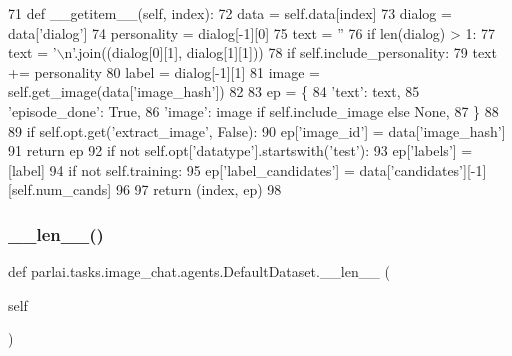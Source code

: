 \begin{DoxyCode}
71     \textcolor{keyword}{def }\_\_getitem\_\_(self, index):
72         data = self.data[index]
73         dialog = data[\textcolor{stringliteral}{'dialog'}]
74         personality = dialog[-1][0]
75         text = \textcolor{stringliteral}{''}
76         \textcolor{keywordflow}{if} len(dialog) > 1:
77             text = \textcolor{stringliteral}{'\(\backslash\)n'}.join((dialog[0][1], dialog[1][1]))
78         \textcolor{keywordflow}{if} self.include\_personality:
79             text += personality
80         label = dialog[-1][1]
81         image = self.get\_image(data[\textcolor{stringliteral}{'image\_hash'}])
82 
83         ep = \{
84             \textcolor{stringliteral}{'text'}: text,
85             \textcolor{stringliteral}{'episode\_done'}: \textcolor{keyword}{True},
86             \textcolor{stringliteral}{'image'}: image \textcolor{keywordflow}{if} self.include\_image \textcolor{keywordflow}{else} \textcolor{keywordtype}{None},
87         \}
88 
89         \textcolor{keywordflow}{if} self.opt.get(\textcolor{stringliteral}{'extract\_image'}, \textcolor{keyword}{False}):
90             ep[\textcolor{stringliteral}{'image\_id'}] = data[\textcolor{stringliteral}{'image\_hash'}]
91             \textcolor{keywordflow}{return} ep
92         \textcolor{keywordflow}{if} \textcolor{keywordflow}{not} self.opt[\textcolor{stringliteral}{'datatype'}].startswith(\textcolor{stringliteral}{'test'}):
93             ep[\textcolor{stringliteral}{'labels'}] = [label]
94         \textcolor{keywordflow}{if} \textcolor{keywordflow}{not} self.training:
95             ep[\textcolor{stringliteral}{'label\_candidates'}] = data[\textcolor{stringliteral}{'candidates'}][-1][self.num\_cands]
96 
97         \textcolor{keywordflow}{return} (index, ep)
98 
\end{DoxyCode}
\mbox{\label{classparlai_1_1tasks_1_1image__chat_1_1agents_1_1DefaultDataset_ae786128b555cabc38b32841f4569ee62}} 
\subsubsection{\texorpdfstring{\+\_\+\+\_\+len\+\_\+\+\_\+()}{\_\_len\_\_()}}
{\footnotesize\ttfamily def parlai.\+tasks.\+image\+\_\+chat.\+agents.\+Default\+Dataset.\+\_\+\+\_\+len\+\_\+\+\_\+ (\begin{DoxyParamCaption}\item[{}]{self }\end{DoxyParamCaption})}



